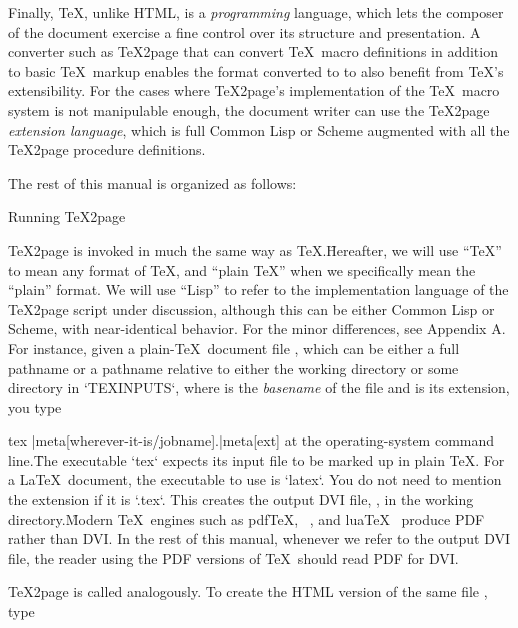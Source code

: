 Finally, \TeX, unlike HTML, is a {\em programming}
language, which lets the composer of the document
exercise a fine control over its structure and
presentation.  A converter such as \TeX2page that can
convert \TeX\ macro definitions in addition to basic \TeX\
markup enables the format converted to to also benefit
from \TeX’s extensibility.  For the cases where
\TeX2page’s implementation of the \TeX\ macro system is
not manipulable enough, the document writer can use the
\TeX2page {\em extension language}, which is full Common Lisp or
Scheme
augmented with all the \TeX2page procedure definitions.

The rest of this manual is organized as follows:

\medskip

\tableofcontents

 Running \TeX2page

%
\TeX2page is invoked in much the same way as \TeX.\f{Hereafter,
we will use “\TeX” to mean
any format of \TeX, and “plain \TeX” when we
specifically mean the “plain” format. We will use “Lisp” to refer
to the implementation language of the \TeX2page script under
discussion, although this can be either Common Lisp or Scheme,
with near-identical behavior. For the minor differences, see
Appendix A.}
For instance, given a plain-\TeX\ document file
, which can
be either a full pathname or a pathname relative to either the
working directory or some directory in `TEXINPUTS`, where
 is the {\em basename} of the file
and  is its extension, you type

\begintt
tex |meta[wherever-it-is/jobname].|meta[ext]
\endtt
%
at the operating-system command line.\f{The executable `tex` expects
its input file to be marked up in plain \TeX.  For a \LaTeX\ document, the
executable to use is `latex`.}  You do not need to mention the extension
\p{.|meta[ext]} if it is `.tex`.  This creates the output DVI file,
\p{|meta[jobname].dvi}, in the working directory.\f{Modern \TeX\ engines
such as pdf\TeX, \XeTeX~\cite{xetex}, and
lua\TeX~\cite{luatex} produce PDF rather than DVI.  In the rest of this manual,
whenever we refer to the output DVI file, the reader using the PDF versions
of \TeX\ should read PDF for DVI.}


\TeX2page is called analogously.  To create the HTML
version of the same file
, type

